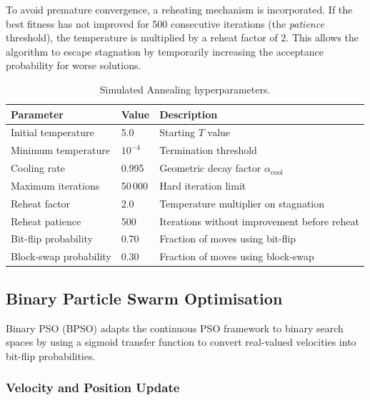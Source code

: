 \documentclass[12pt,a4paper]{article}
\begin{document}
To avoid premature convergence, a reheating mechanism is incorporated.
If the best fitness has not improved for 500 consecutive iterations (the \emph{patience} threshold), the temperature is multiplied by a reheat factor of 2.
This allows the algorithm to escape stagnation by temporarily increasing the acceptance probability for worse solutions.

\begin{table}[H]
  \centering
  \caption{Simulated Annealing hyperparameters.}
  \label{tab:sa_params}
  \begin{tabular}{lll}
    \toprule
    \textbf{Parameter} & \textbf{Value} & \textbf{Description} \\
    \midrule
    Initial temperature   & 5.0          & Starting $T$ value \\
    Minimum temperature   & $10^{-4}$    & Termination threshold \\
    Cooling rate          & 0.995        & Geometric decay factor $\alpha_{\text{cool}}$ \\
    Maximum iterations    & 50\,000      & Hard iteration limit \\
    Reheat factor         & 2.0          & Temperature multiplier on stagnation \\
    Reheat patience       & 500          & Iterations without improvement before reheat \\
    Bit-flip probability  & 0.70         & Fraction of moves using bit-flip \\
    Block-swap probability& 0.30         & Fraction of moves using block-swap \\
    \bottomrule
  \end{tabular}
\end{table}

\subsection{Binary Particle Swarm Optimisation}

Binary PSO (BPSO) adapts the continuous PSO framework to binary search spaces by using a sigmoid transfer function to convert real-valued velocities into bit-flip probabilities.

\subsubsection*{Velocity and Position Update}
\end{document}
